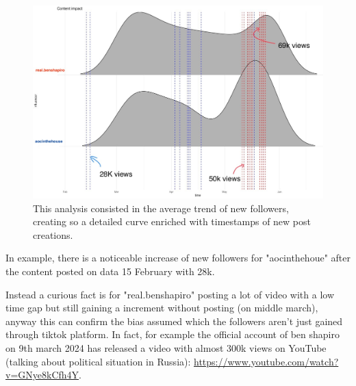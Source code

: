 \begin{figure}[h]
    \centering
    \includegraphics[width = .5\textwidth]{images/Final_ContentImpact_Custom.jpg}
    \caption*{This analysis consisted in the average trend of new followers, creating so a detailed curve enriched with timestamps of new post creations.}
\end{figure}

In example, there is a noticeable increase of new followers for "aocinthehoue" after the content posted on data 15 February with 28k.

Instead a curious fact is for "real.benshapiro" posting a lot of video with a low time gap but still gaining a increment without posting (on middle march), anyway this can confirm the bias assumed which the followers aren't just gained through tiktok platform. In fact, for example the official account of ben shapiro on 9th march 2024 has released a video with almost 300k views on YouTube (talking about political situation in Russia): \url{https://www.youtube.com/watch?v=GNye8kCfh4Y}.